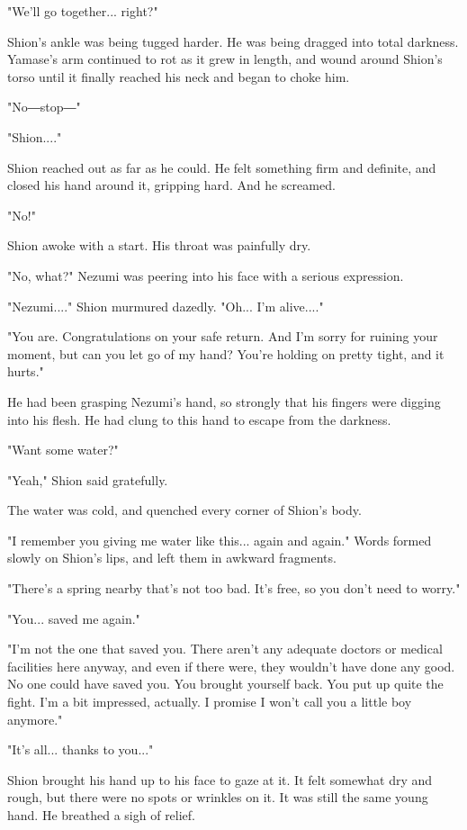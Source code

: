 "We'll go together... right?"

Shion's ankle was being tugged harder. He was being dragged into total
darkness. Yamase's arm continued to rot as it grew in length, and wound
around Shion's torso until it finally reached his neck and began to
choke him.

"No―stop―"

"Shion...."

Shion reached out as far as he could. He felt something firm and
definite, and closed his hand around it, gripping hard. And he screamed.

"No!"

Shion awoke with a start. His throat was painfully dry.

"No, what?" Nezumi was peering into his face with a serious expression.

"Nezumi...." Shion murmured dazedly. "Oh... I'm alive...."

"You are. Congratulations on your safe return. And I'm sorry for ruining
your moment, but can you let go of my hand? You're holding on pretty
tight, and it hurts."

He had been grasping Nezumi's hand, so strongly that his fingers were
digging into his flesh. He had clung to this hand to escape from the
darkness.

"Want some water?"

"Yeah," Shion said gratefully.

The water was cold, and quenched every corner of Shion's body.

"I remember you giving me water like this... again and again." Words
formed slowly on Shion's lips, and left them in awkward fragments.

"There's a spring nearby that's not too bad. It's free, so you don't
need to worry."

"You... saved me again."

"I'm not the one that saved you. There aren't any adequate doctors or
medical facilities here anyway, and even if there were, they wouldn't
have done any good. No one could have saved you. You brought yourself
back. You put up quite the fight. I'm a bit impressed, actually. I
promise I won't call you a little boy anymore."

"It's all... thanks to you..."

Shion brought his hand up to his face to gaze at it. It felt somewhat
dry and rough, but there were no spots or wrinkles on it. It was still
the same young hand. He breathed a sigh of relief.


